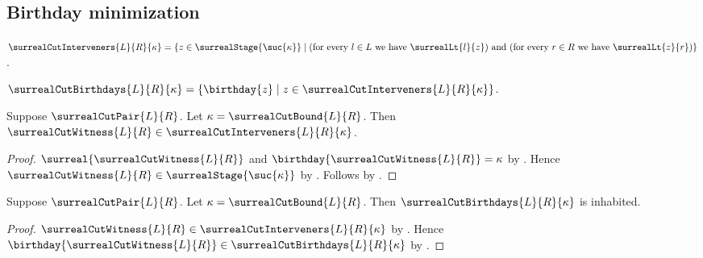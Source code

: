\subsection{Birthday minimization}

\begin{definition}\label{surreal_cut_interveners}
    $\surrealCutInterveners{L}{R}{\kappa}=
        \{z\in\surrealStage{\suc{\kappa}}\mid
            \text{(for every $l\in L$ we have $\surrealLt{l}{z}$) and
                (for every $r\in R$ we have $\surrealLt{z}{r}$)}\}$.
\end{definition}

\begin{definition}\label{surreal_cut_intervener_birthdays}
    $\surrealCutBirthdays{L}{R}{\kappa}=
        \{\birthday{z}\mid z\in\surrealCutInterveners{L}{R}{\kappa}\}$.
\end{definition}

\begin{proposition}\label{surreal_cut_witness_is_intervener}
    Suppose $\surrealCutPair{L}{R}$.
    Let $\kappa=\surrealCutBound{L}{R}$.
    Then $\surrealCutWitness{L}{R}\in
        \surrealCutInterveners{L}{R}{\kappa}$.
\end{proposition}
\begin{proof}
    $\surreal{\surrealCutWitness{L}{R}}$ and
        $\birthday{\surrealCutWitness{L}{R}}=\kappa$
        by .
    Hence $\surrealCutWitness{L}{R}\in\surrealStage{\suc{\kappa}}$
        by .
    Follows by .
\end{proof}

\begin{proposition}\label{surreal_cut_intervener_birthdays_inhabited}
    Suppose $\surrealCutPair{L}{R}$.
    Let $\kappa=\surrealCutBound{L}{R}$.
    Then $\surrealCutBirthdays{L}{R}{\kappa}$ is inhabited.
\end{proposition}
\begin{proof}
    $\surrealCutWitness{L}{R}\in
        \surrealCutInterveners{L}{R}{\kappa}$
        by .
    Hence $\birthday{\surrealCutWitness{L}{R}}\in
        \surrealCutBirthdays{L}{R}{\kappa}$
        by .
\end{proof}

